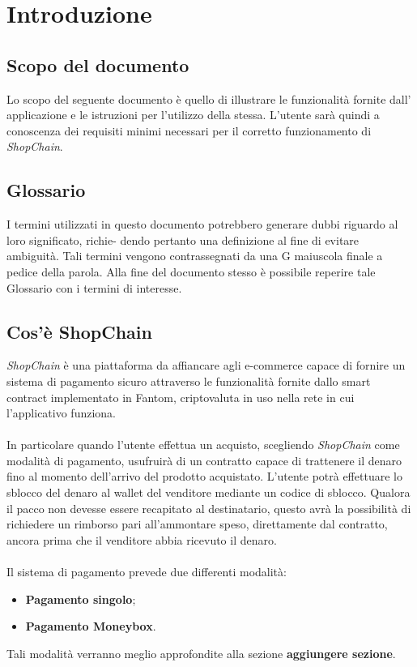 \section{Introduzione}\label{section:introduzione}

\subsection{Scopo del documento}
Lo scopo del seguente documento è quello di illustrare le funzionalità fornite dall' applicazione e le istruzioni per l'utilizzo della stessa.
L'utente sarà quindi a conoscenza dei requisiti minimi necessari per il corretto funzionamento di \textit{ShopChain}.

\subsection{Glossario}
I termini utilizzati in questo documento potrebbero generare dubbi riguardo al loro significato, richie-
dendo pertanto una definizione al fine di evitare ambiguità. Tali termini vengono contrassegnati da
una G maiuscola finale a pedice della parola. Alla fine del documento stesso è possibile reperire tale Glossario con i termini di interesse.

\subsection{Cos'è ShopChain}
\textit{ShopChain} è una piattaforma da affiancare agli e-commerce\glo{} capace di fornire un sistema di pagamento sicuro attraverso le funzionalità fornite dallo smart contract\glo{} implementato in Fantom\glo{}, criptovaluta\glo{} in uso nella rete in cui l'applicativo funziona.\\\\
In particolare quando l'utente effettua un acquisto, scegliendo \textit{ShopChain} come modalità di pagamento, usufruirà di un contratto capace di trattenere il denaro fino al momento dell'arrivo del prodotto acquistato. L'utente potrà effettuare lo sblocco  del denaro al wallet\glo{} del venditore mediante un codice di sblocco. Qualora il pacco non devesse essere recapitato al destinatario, questo avrà la possibilità di richiedere un rimborso pari all'ammontare speso, direttamente dal contratto, ancora prima che il venditore abbia ricevuto il denaro.\\\\
Il sistema di pagamento prevede due differenti modalità:
\begin{itemize}
    \item \textbf{Pagamento singolo};
    \item  \textbf{Pagamento Moneybox}.
\end{itemize}
Tali modalità verranno meglio approfondite alla sezione \textbf{aggiungere sezione}.

